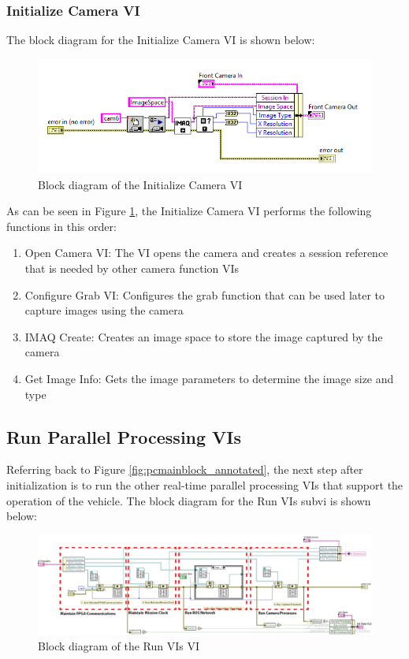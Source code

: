 \newpage

\subsubsection{Initialize Camera VI}

The block diagram for the Initialize Camera VI is shown below:
\begin{figure}[h!]
\centering
\includegraphics[scale=0.75]{Photos/initcamblock.png}
\caption{Block diagram of the Initialize Camera VI}
\label{fig:initcamblock}
\end{figure}

\noindent As can be seen in Figure \ref{fig:initcamblock}, the Initialize Camera VI performs the following functions in this order:

\begin{enumerate}
\item Open Camera VI: The VI opens the camera and creates a session reference that is needed by other camera function VIs
\item Configure Grab VI: Configures the grab function that can be used later to capture images using the camera
\item IMAQ Create: Creates an image space to store the image captured by the camera
\item Get Image Info: Gets the image parameters to determine the image size and type
\end{enumerate}

\newpage

\subsection{Run Parallel Processing VIs}

Referring back to Figure \ref{fig:pcmainblock_annotated}, the next step after initialization is to run the other real-time parallel processing VIs that support the operation of the vehicle. The block diagram for the Run VIs subvi is shown below:

\begin{figure}[h!]
\centering
\includegraphics[scale=0.35]{Photos/RunVIs.png}
\caption{Block diagram of the Run VIs VI}
\label{fig:runvis}
\end{figure}

